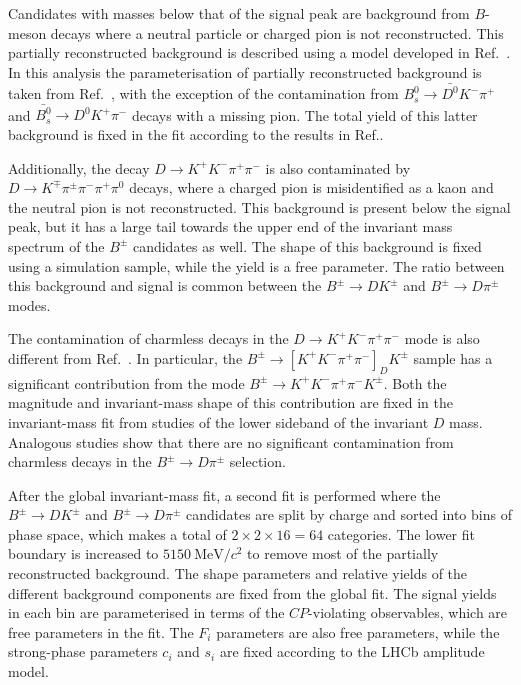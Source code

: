 \documentclass[12pt, a4paper, notitlepage, onecolumn]{article}
\begin{document}
Candidates with masses below that of the signal peak are background from $B$-meson decays where a neutral particle or charged pion is not reconstructed. This partially reconstructed background is described using a model developed in Ref.~\cite{LHCb-PAPER-2020-019}. In this analysis the parameterisation of partially reconstructed background is taken from Ref.~\cite{LHCb-PAPER-2020-019}, with the exception of the contamination from $B^0_s\to\bar{D^0}K^-\pi^+$ and $\bar{B^0_s}\to D^0K^+\pi^-$ decays with a missing pion. The total yield of this latter background is fixed in the fit according to the results in Ref.\cite{LHCb-PAPER-2020-036}.

Additionally, the decay $D\to K^+K^-\pi^+\pi^-$ is also contaminated by $D\to K^\mp\pi^\pm\pi^-\pi^+\pi^0$ decays, where a charged pion is misidentified as a kaon and the neutral pion is not reconstructed. This background is present below the signal peak, but it has a large tail towards the upper end of the invariant mass spectrum of the $B^\pm$ candidates as well. The shape of this background is fixed using a simulation sample, while the yield is a free parameter. The ratio between this background and signal is common between the $B^\pm\to DK^\pm$ and $B^\pm\to D\pi^\pm$ modes.

The contamination of charmless decays in the $D\to K^+K^-\pi^+\pi^-$ mode is also different from Ref.~\cite{LHCb-PAPER-2020-019}. In particular, the $B^\pm\to[K^+K^-\pi^+\pi^-]_DK^\pm$ sample has a significant contribution from the mode $B^\pm\to K^+K^-\pi^+\pi^-K^\pm$. Both the magnitude and invariant-mass shape of this contribution are fixed in the invariant-mass fit from studies of the lower sideband of the invariant $D$ mass. Analogous studies show that there are no significant contamination from charmless decays in the $B^\pm\to D\pi^\pm$ selection.

After the global invariant-mass fit, a second fit is performed where the $B^\pm\to DK^\pm$ and $B^\pm\to D\pi^\pm$ candidates are split by charge and sorted into bins of phase space, which makes a total of $2\times 2\times 16 = 64$ categories. The lower fit boundary is increased to $\SI{5150}{\mega\eV/c^2}$ to remove most of the partially reconstructed background. The shape parameters and relative yields of the different background components are fixed from the global fit. The signal yields in each bin are parameterised in terms of the $C\!P$-violating observables, which are free parameters in the fit. The $F_i$ parameters are also free parameters, while the strong-phase parameters $c_i$ and $s_i$ are fixed according to the LHCb amplitude model.
\end{document}
